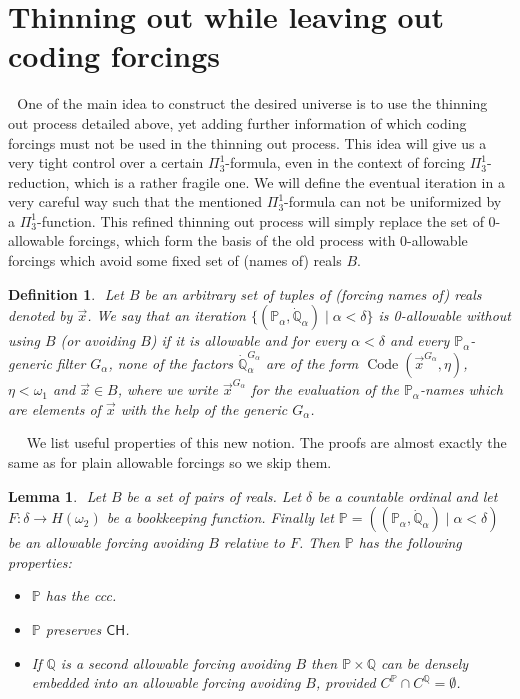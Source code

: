 \documentclass[a4paper,11pt]{article}
\newtheorem{lemma}[theorem]{Lemma}
\newtheorem{definition}[theorem]{Definition}
\newcommand{\forceP}{\mathbb{P}}
\newcommand{\forceQ}{\mathbb{Q}}
\newcommand{\CH}{\mathsf{CH}}
\begin{document}
    \section{Thinning out while leaving out coding forcings}
    ﻿
    ﻿
    One of the main idea to construct the desired universe is to use the thinning out process detailed above, yet adding further information of which coding forcings must not be used in the thinning out process. This idea will give us a very tight control over a certain $\Pi^1_3$-formula, even in the context of forcing $\Pi^1_3$-reduction, which is a rather fragile one. We will define the eventual iteration in a very careful way such that the mentioned $\Pi^1_3$-formula can not be uniformized by a $\Pi^1_3$-function.
    ﻿
    This refined thinning out process will simply replace the set of 0-allowable forcings, which form the basis of the old process with 0-allowable forcings which avoid some fixed set of (names of) reals $B$. 
    \begin{definition}
    ﻿
    Let $B$ be an arbitrary set of  tuples of (forcing names of) reals denoted by $\vec{x}$.  We say that an iteration $\{ (\forceP_{\alpha},\dot{\forceQ}_{\alpha}) \mid \alpha < \delta \}$  is 0-allowable without  using $B$ (or avoiding $B$) if it is allowable and for every $\alpha< \delta$ and every $\forceP_{\alpha}
$-generic filter $G_{\alpha}$, none of the factors $\dot{\forceQ}_{\alpha}^{G_{\alpha}}$ are of the form $\operatorname{Code} (\vec{x}^{G_{\alpha}}, \eta)$, $\eta < \omega_1$ and $\vec{x} \in B$, where we write $\vec{x}^{G_{\alpha}}$ for the evaluation of the $\forceP_{\alpha}$-names which are elements of $\vec{x}$ with the help of the generic $G_{\alpha}$. 
    ﻿
    \end{definition}
    ﻿
    ﻿
    ﻿
    ﻿
    We list useful properties of this new notion. The proofs are almost exactly the same as for plain allowable forcings so we skip them.
    ﻿
    \begin{lemma}
    ﻿
    Let $B$ be a set of pairs of  reals. Let $\delta$ be a countable ordinal and let $F : \delta \rightarrow H(\omega_2)$ be a bookkeeping function. Finally let $\forceP= ((\forceP_{\alpha}, \dot{\forceQ}_{\alpha} ) \mid \alpha < \delta)$ be an allowable forcing avoiding $B$ relative to $F$. Then $\forceP$ has the following properties:
    ﻿
    \begin{itemize}
    ﻿
    \item $\forceP$ has the ccc.
    ﻿
    \item $\forceP$ preserves $\CH$.
    ﻿
    \item If $\forceQ$ is a second allowable forcing avoiding $B$ then $\forceP \times \forceQ$ can be densely embedded into an allowable forcing avoiding $B$, provided $C^{\forceP} \cap C^{\forceQ} = \emptyset$.
    ﻿
    \end{itemize}
    ﻿
    \end{lemma}
\end{document}
